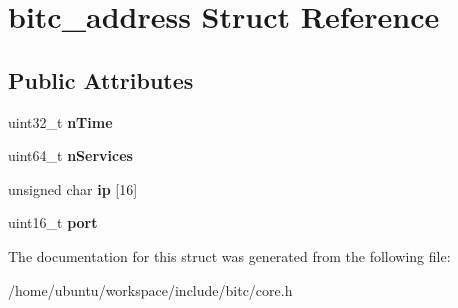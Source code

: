 \hypertarget{structbitc__address}{\section{bitc\-\_\-address Struct Reference}
\label{structbitc__address}
}
\subsection*{Public Attributes}
\begin{DoxyCompactItemize}
\item 
\hypertarget{structbitc__address_ad9bf6c945fc788ea01e17191839193a0}{uint32\-\_\-t {\bfseries n\-Time}}\label{structbitc__address_ad9bf6c945fc788ea01e17191839193a0}

\item 
\hypertarget{structbitc__address_a5b16c341b95462842b3f14f8d541d791}{uint64\-\_\-t {\bfseries n\-Services}}\label{structbitc__address_a5b16c341b95462842b3f14f8d541d791}

\item 
\hypertarget{structbitc__address_a1e68e9ce780566b3e91cf37e4beff712}{unsigned char {\bfseries ip} \mbox{[}16\mbox{]}}\label{structbitc__address_a1e68e9ce780566b3e91cf37e4beff712}

\item 
\hypertarget{structbitc__address_a2daf58e2118dcb8d78ce90582bf23722}{uint16\-\_\-t {\bfseries port}}\label{structbitc__address_a2daf58e2118dcb8d78ce90582bf23722}

\end{DoxyCompactItemize}


The documentation for this struct was generated from the following file\-:\begin{DoxyCompactItemize}
\item 
/home/ubuntu/workspace/include/bitc/core.\-h\end{DoxyCompactItemize}
